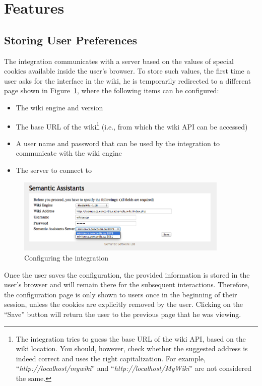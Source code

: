 \section{Features}
\subsection{Storing User Preferences} The \wikinlp integration communicates with a \sa server based on the values of special cookies available inside the user's browser. To store such values, the first time a user asks for the \wikinlp interface in the wiki, he is temporarily redirected to a different page shown in Figure~\ref{fig:wiki_config}, where the following items can be configured:

\begin{itemize}\itemsep1mm
\item The wiki engine and version
\item The base URL of the wiki\footnote{The \wikinlp integration tries to guess the base URL of the wiki API, based on the wiki location. You should, however, check whether the suggested address is indeed correct and uses the right capitalization. For example, ``\emph{http://localhost/mywiki}'' and ``\emph{http://localhost/MyWiki}'' are not considered the same.} (i.e., from which the wiki API can be accessed)
\item A user name and password that can be used by the \wikinlp integration to communicate with the wiki engine
\item The \sa server to connect to
\end{itemize}

\begin{figure}[ht]
\centering
\includegraphics[width=0.9\textwidth]{pictures/wiki_config.png}
\caption{Configuring the \wikinlp integration}
\label{fig:wiki_config}
\end{figure}

Once the user saves the configuration, the provided information is stored in the user's browser and will remain there for the subsequent \wikinlp interactions. Therefore, the configuration page is only shown to users once in the beginning of their session, unless the cookies are explicitly removed by the user. Clicking on the ``Save'' button will return the user to the previous page that he was viewing.

